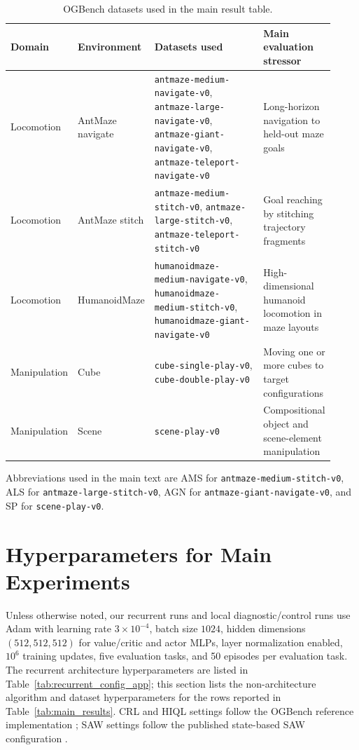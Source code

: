 \documentclass{article}
\begin{document}
\begin{table}[h]
\centering
\scriptsize
\setlength{\tabcolsep}{3pt}
\caption{OGBench datasets used in the main result table.}
\label{tab:ogbench_tasks_app}
\begin{tabular}{L{0.15\linewidth}L{0.18\linewidth}L{0.38\linewidth}L{0.21\linewidth}}
\toprule
Domain & Environment & Datasets used & Main evaluation stressor \\
\midrule
Locomotion & AntMaze navigate & \texttt{antmaze-medium-navigate-v0}, \texttt{antmaze-large-navigate-v0}, \texttt{antmaze-giant-navigate-v0}, \texttt{antmaze-teleport-navigate-v0} & Long-horizon navigation to held-out maze goals \\
Locomotion & AntMaze stitch & \texttt{antmaze-medium-stitch-v0}, \texttt{antmaze-large-stitch-v0}, \texttt{antmaze-teleport-stitch-v0} & Goal reaching by stitching trajectory fragments \\
Locomotion & HumanoidMaze & \texttt{humanoidmaze-medium-navigate-v0}, \texttt{humanoidmaze-medium-stitch-v0}, \texttt{humanoidmaze-giant-navigate-v0} & High-dimensional humanoid locomotion in maze layouts \\
Manipulation & Cube & \texttt{cube-single-play-v0}, \texttt{cube-double-play-v0} & Moving one or more cubes to target configurations \\
Manipulation & Scene & \texttt{scene-play-v0} & Compositional object and scene-element manipulation \\
\bottomrule
\end{tabular}
\end{table}
\FloatBarrier

Abbreviations used in the main text are AMS for \texttt{antmaze-medium-stitch-v0}, ALS for \texttt{antmaze-large-stitch-v0}, AGN for \texttt{antmaze-giant-navigate-v0}, and SP for \texttt{scene-play-v0}.

\section{Hyperparameters for Main Experiments}
\label{app:hyperparameters}

Unless otherwise noted, our recurrent runs and local diagnostic/control runs use Adam with learning rate $3\times 10^{-4}$, batch size $1024$, hidden dimensions $(512,512,512)$ for value/critic and actor MLPs, layer normalization enabled, $10^6$ training updates, five evaluation tasks, and 50 episodes per evaluation task.
The recurrent architecture hyperparameters are listed in Table~\ref{tab:recurrent_config_app}; this section lists the non-architecture algorithm and dataset hyperparameters for the rows reported in Table~\ref{tab:main_results}.
CRL and HIQL settings follow the OGBench reference implementation \citep{ogbench}; SAW settings follow the published state-based SAW configuration \citep{saw}.
\end{document}
